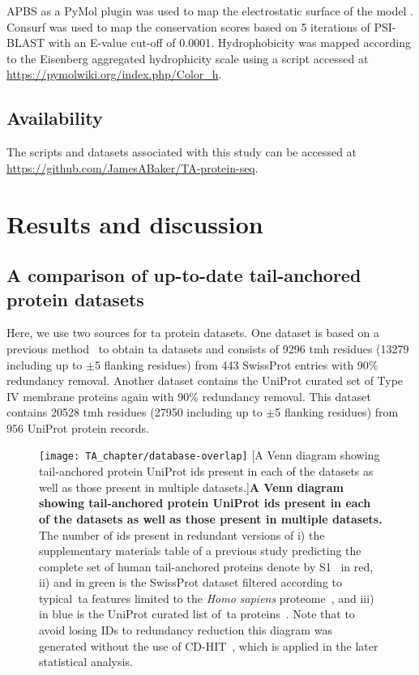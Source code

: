 APBS as a PyMol plugin was used to map the electrostatic surface of the model \cite{Baker2001}.
Consurf \cite{Ashkenazy2010} was used to map the conservation scores based on 5 iterations of PSI-BLAST \cite{Altschul1997} with an E-value cut-off of 0.0001.
Hydrophobicity was mapped according to the Eisenberg aggregated hydrophicity scale \cite{Eisenberg1984} using a script accessed at \url{https://pymolwiki.org/index.php/Color_h}.

\subsection{Availability}

The scripts and datasets associated with this study can be accessed at \url{https://github.com/JamesABaker/TA-protein-seq}.

\section{Results and discussion}

\subsection{A comparison of up-to-date tail-anchored protein datasets}
Here, we use two sources for \gls{ta} protein datasets.
One dataset is based on a previous method~\cite{Kalbfleisch2007} to obtain \gls{ta} datasets and consists of 9296 \gls{tmh} residues (13279 including up to $\pm$5 flanking residues) from 443 SwissProt entries with 90\% redundancy removal.
Another dataset contains the UniProt curated set of Type IV membrane proteins again with 90\% redundancy removal.
This dataset contains 20528 \gls{tmh} residues (27950 including up to $\pm$5 flanking residues) from 956 UniProt protein records.

\begin{figure}
\centering
\texttt{[image: TA\_chapter/database-overlap]}
        [A Venn diagram showing tail-anchored protein UniProt ids present in each of the datasets as well as those present in multiple datasets.]{\textbf{A Venn diagram showing tail-anchored protein UniProt ids present in each of the datasets as well as those present in multiple datasets.}
The number of ids present in redundant versions of
i) the supplementary materials table of a previous study predicting the complete set of human tail-anchored proteins denote by S1~\cite{Kalbfleisch2007} in red,
ii) and in green is the SwissProt dataset filtered according to typical~\gls{ta} features limited to the \textit{Homo sapiens} proteome~\cite{TheUniProtConsortium2014}, and
iii) in blue is the UniProt curated list of~\gls{ta} proteins~\cite{TheUniProtConsortium2014}.
Note that to avoid losing IDs to redundancy reduction this diagram was generated without the use of CD-HIT~\cite{Huang2010, Wu2011}, which is applied in the later statistical analysis.}

\label{fig:tadatasetoverlap}
\end{figure}

